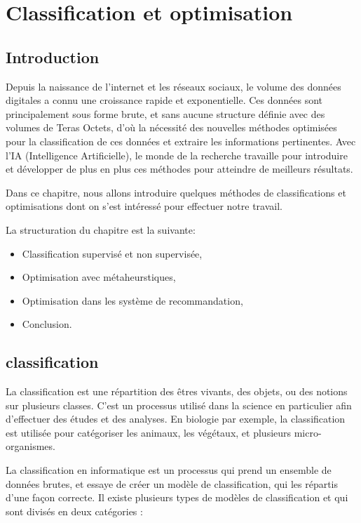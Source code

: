 \chapter{Classification et optimisation}
\thispagestyle{empty}
\newpage
\section{Introduction}
Depuis la naissance de l’internet et les réseaux sociaux, le volume des données digitales a connu une croissance rapide et exponentielle. Ces données sont principalement sous forme brute, et sans aucune structure définie avec des volumes de Teras Octets, d'où la nécessité des nouvelles méthodes optimisées pour la classification de ces données et extraire les informations pertinentes. Avec l’IA (Intelligence Artificielle), le monde de la recherche travaille pour introduire et développer de plus en plus ces méthodes pour atteindre de meilleurs résultats.

Dans ce chapitre, nous allons introduire quelques méthodes de classifications et optimisations dont on s'est intéressé pour effectuer notre travail.       

La structuration du chapitre est la suivante:
\begin{itemize}
	\item Classification supervisé et non supervisée,
	\item Optimisation avec métaheurstiques,
	\item Optimisation dans les système de recommandation,
	\item Conclusion.
\end{itemize}

\section {classification}
La classification est une répartition des êtres vivants, des objets, ou des notions sur plusieurs classes. C’est un processus utilisé dans la science en particulier afin d'effectuer des études et des analyses.
En biologie par exemple, la classification est utilisée pour catégoriser les animaux, les végétaux, et plusieurs micro-organismes.

La classification en informatique est un processus qui prend un ensemble de données brutes, et essaye de créer un modèle de classification, qui les répartis d’une façon correcte. Il existe plusieurs types de modèles de classification et qui sont divisés en deux catégories :

